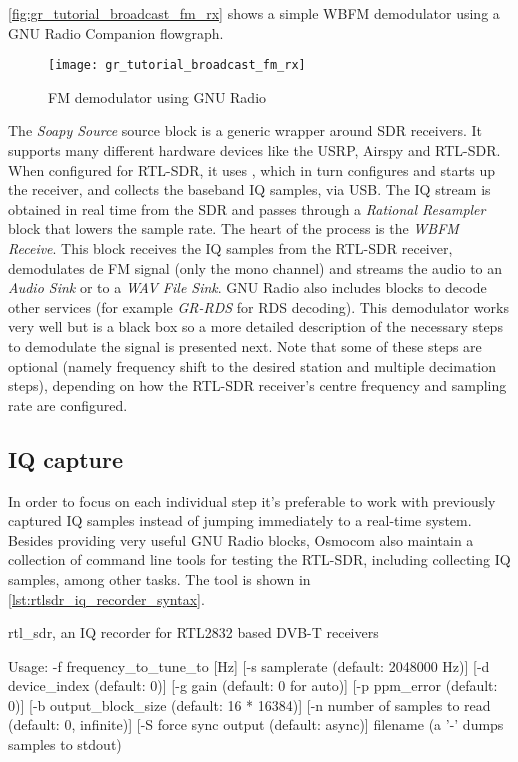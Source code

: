 \autoref{fig:gr_tutorial_broadcast_fm_rx} shows a simple WBFM demodulator using a GNU Radio Companion flowgraph.
\begin{figure}[H]
  \centering
  \texttt{[image: gr\_tutorial\_broadcast\_fm\_rx]}
  \caption{FM demodulator using GNU Radio}
  \label{fig:gr_tutorial_broadcast_fm_rx}
\end{figure}
The \emph{Soapy Source} source block is a generic wrapper around SDR receivers. It supports many different hardware devices like the USRP, Airspy and RTL-SDR. When configured for RTL-SDR, it uses , which in turn configures and starts up the receiver, and collects the baseband IQ samples, via USB. The IQ stream is obtained in real time from the SDR and passes through a \emph{Rational Resampler} block that lowers the sample rate. The heart of the process is the \emph{WBFM Receive}. This block receives the IQ samples from the RTL-SDR receiver, demodulates de FM signal (only the mono channel) and streams the audio to an \emph{Audio Sink} or to a \emph{WAV File Sink}. GNU Radio also includes blocks to decode other services (for example \emph{GR-RDS} for RDS decoding). This demodulator works very well but is a black box so a more detailed description of the necessary steps to demodulate the signal is presented next. Note that some of these steps are optional (namely frequency shift to the desired station and multiple decimation steps), depending on how the RTL-SDR receiver's centre frequency and sampling rate are configured.

\subsection{IQ capture}

In order to focus on each individual step it's preferable to work with previously captured IQ samples instead of jumping immediately to a real-time system. Besides providing very useful GNU Radio blocks, Osmocom also maintain a collection of command line tools for testing the RTL-SDR, including collecting IQ samples, among other tasks. The tool is shown in \autoref{lst:rtlsdr_iq_recorder_syntax}.
\begin{bash}[label={lst:rtlsdr_iq_recorder_syntax},caption={RTL-SDR IQ recorder syntax}]
rtl_sdr, an IQ recorder for RTL2832 based DVB-T receivers

Usage: -f frequency_to_tune_to [Hz]
	[-s samplerate (default: 2048000 Hz)]
	[-d device_index (default: 0)]
	[-g gain (default: 0 for auto)]
	[-p ppm_error (default: 0)]
	[-b output_block_size (default: 16 * 16384)]
	[-n number of samples to read (default: 0, infinite)]
	[-S force sync output (default: async)]
	filename (a '-' dumps samples to stdout)
\end{bash}

